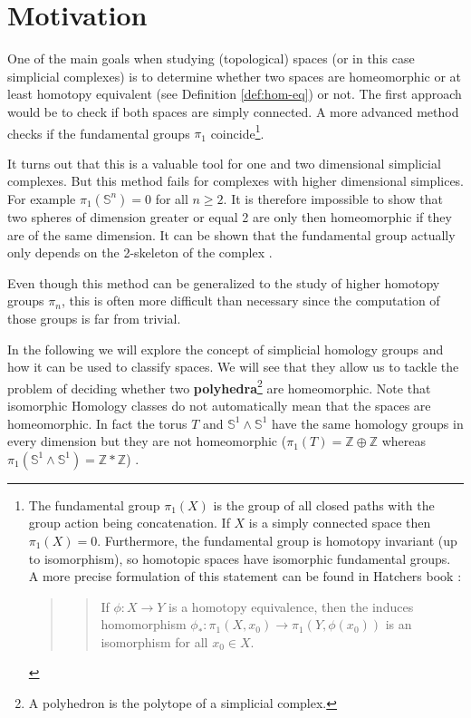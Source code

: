 \documentclass[toc=bib, headinclude]{scrartcl}
\theoremstyle{plain}
\theoremstyle{definition}
\theoremstyle{remark}
\newcommand{\sh}{simplicial homology}
\newcommand{\Z}{\mathbb{Z}}
\newcommand{\scs}{simplicial complexes}
\begin{document}
\section{Motivation}\label{motivation}
One of the main goals when studying (topological) spaces (or in this case \scs) is to determine whether two spaces are homeomorphic or at least homotopy equivalent (see Definition \ref{def:hom-eq}) 
or not. The first approach would be to check if both spaces are simply connected. A more advanced method checks if the fundamental groups $\pi_1$ coincide\footnote{The fundamental group $\pi_1(X)$ is the group of all closed paths with the group action being concatenation. If $X$ is a simply connected space then $\pi_1(X)=0$. Furthermore, the fundamental group is homotopy invariant (up to isomorphism), so homotopic spaces have isomorphic fundamental groups. A more precise formulation of this statement can be found in Hatchers book \parencite[Prop. 1.18, p. 37]{ha}:
\begin{quotation}
	\begin{quote}
		If $\phi: X\to Y$ is a homotopy equivalence, then the induces homomorphism $\phi_*:\pi_1(X,x_0)\to\pi_1(Y,\phi(x_0))$ is an isomorphism for all $x_0\in X$.
	\end{quote}
\end{quotation} }.

It turns out that this is a valuable tool for one and two dimensional \scs. But this method fails for complexes with higher dimensional simplices. For example $\pi_1(\mathbb{S}^n)=0$ for all $n\geq 2$. It is therefore impossible to show that two spheres of dimension greater or equal 2 are only then homeomorphic if they are of the same dimension. It can be shown that the fundamental group actually only depends on the 2-skeleton of the complex \cite[vgl.][p. 173]{ar}. 

Even though this method can be generalized to the study of higher homotopy groups $\pi_n$, this is often more difficult than necessary since the computation of those groups is far from trivial.

In the following we will explore the concept of \sh{} groups and how it can be used to classify spaces. We will see that they allow us to tackle the problem of deciding whether two \textbf{polyhedra}\footnote{A polyhedron is the polytope of a simplicial complex.} are homeomorphic. Note that isomorphic Homology classes do not automatically mean that the spaces are homeomorphic. In fact the torus $T$ and $\mathbb{S}^1\wedge\mathbb{S}^1$ have the same homology groups in every dimension but they are not homeomorphic ($\pi_1(T)=\Z\oplus\Z$ whereas $\pi_1(\mathbb{S}^1\wedge\mathbb{S}^1)=\Z\ast\Z$) .
\end{document}
